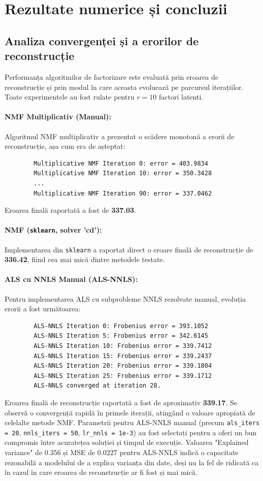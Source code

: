\documentclass[12pt,a4paper]{article}
\begin{document}
	
	\section{Rezultate numerice și concluzii}
	
	\subsection{Analiza convergenței și a erorilor de reconstrucție}
	\label{subsec:convergenta-erori}
	
	Performanța algoritmilor de factorizare este evaluată prin eroarea de reconstrucție și prin modul în care aceasta evoluează pe parcursul iterațiilor. Toate experimentele au fost rulate pentru $r=10$ factori latenti.
	
	\paragraph{NMF Multiplicativ (Manual):}
	Algoritmul NMF multiplicativ a prezentat o scădere monotonă a erorii de reconstrucție, așa cum era de așteptat:
	\begin{verbatim}
		Multiplicative NMF Iteration 0: error = 403.9834
		Multiplicative NMF Iteration 10: error = 350.3428
		...
		Multiplicative NMF Iteration 90: error = 337.0462
	\end{verbatim}
	Eroarea finală raportată a fost de \textbf{337.03}.
	
	\paragraph{NMF (\texttt{sklearn}, solver 'cd'):}
	Implementarea din \texttt{sklearn} a raportat direct o eroare finală de reconstrucție de \textbf{336.42}, fiind cea mai mică dintre metodele testate.
	
	\paragraph{ALS cu NNLS Manual (ALS-NNLS):}
	Pentru implementarea ALS cu subprobleme NNLS rezolvate manual, evoluția erorii a fost următoarea:
	\begin{verbatim}
		ALS-NNLS Iteration 0: Frobenius error = 393.1052
		ALS-NNLS Iteration 5: Frobenius error = 342.6145
		ALS-NNLS Iteration 10: Frobenius error = 339.7412
		ALS-NNLS Iteration 15: Frobenius error = 339.2437
		ALS-NNLS Iteration 20: Frobenius error = 339.1804
		ALS-NNLS Iteration 25: Frobenius error = 339.1712
		ALS-NNLS converged at iteration 28.
	\end{verbatim}
	Eroarea finală de reconstrucție raportată a fost de aproximativ \textbf{339.17}. Se observă o convergență rapidă în primele iterații, atingând o valoare apropiată de celelalte metode NMF. Parametrii pentru ALS-NNLS manual (precum \texttt{als\_iters = 20}, \texttt{nnls\_iters = 50}, \texttt{lr\_nnls = 1e-3}) au fost selectați pentru a oferi un bun compromis între acuratețea soluției și timpul de execuție. Valoarea "Explained variance" de 0.356 și MSE de 0.0227 pentru ALS-NNLS indică o capacitate rezonabilă a modelului de a explica varianța din date, deși nu la fel de ridicată ca în cazul în care eroarea de reconstrucție ar fi fost și mai mică.
	
\end{document}
